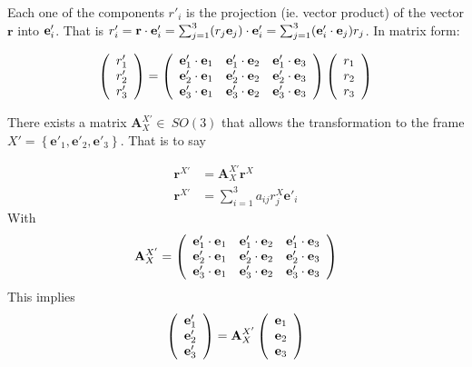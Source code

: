 Each one of the components $r'_i$ is the projection (ie. vector product) of the vector $\mathbf{r}$ into $\mathbf{e}'_i$. That is $r'_i = \mathbf{r} \cdot \mathbf{e}'_i =  \sum_{j=1}^{3} (r_j \mathbf{e}_j)\cdot \mathbf{e}'_i = \sum_{j=1}^{3} (\mathbf{e}'_i \cdot \mathbf{e}_j) r_j$. In matrix form:

\begin{equation}
\left( \begin{array}{c} r'_1 \\ r'_2 \\ r'_3 \end{array} \right) = 
\left( \begin{array}{c c c}  
\mathbf{e}'_1\cdot\mathbf{e}_1 & \mathbf{e}'_1\cdot\mathbf{e}_2 & \mathbf{e}'_1\cdot\mathbf{e}_3 \\
\mathbf{e}'_2\cdot\mathbf{e}_1 & \mathbf{e}'_2\cdot\mathbf{e}_2 & \mathbf{e}'_2\cdot\mathbf{e}_3 \\
\mathbf{e}'_3\cdot\mathbf{e}_1 & \mathbf{e}'_3\cdot\mathbf{e}_2 & \mathbf{e}'_3\cdot\mathbf{e}_3 \end{array} \right) 
\left( \begin{array}{c} r_1\\ r_2 \\ r_3 \end{array} \right)
\end{equation}

There exists a matrix $\mathbf{A}_X^{X'} \in\ SO(3)$ that allows the transformation to the frame {$X' = \left\{\mathbf{e}'_1, \mathbf{e}'_2, \mathbf{e}'_3 \right\}$}. That is to say

\begin{align}
\mathbf{r}^{X'} &= \mathbf{A}_X^{X'} \mathbf{r}^{X}\\
\mathbf{r}^{X'} &= \sum_{i=1}^{3} a_{ij} r_j^X \mathbf{e}'_i
\end{align}
With
\begin{equation} \label{eq:DCM}
\mathbf{A}_X^{X'} =
\left( \begin{array}{c c c}  
\mathbf{e}'_1\cdot\mathbf{e}_1 & \mathbf{e}'_1\cdot\mathbf{e}_2 & \mathbf{e}'_1\cdot\mathbf{e}_3 \\
\mathbf{e}'_2\cdot\mathbf{e}_1 & \mathbf{e}'_2\cdot\mathbf{e}_2 & \mathbf{e}'_2\cdot\mathbf{e}_3 \\
\mathbf{e}'_3\cdot\mathbf{e}_1 & \mathbf{e}'_3\cdot\mathbf{e}_2 & \mathbf{e}'_3\cdot\mathbf{e}_3 \end{array} \right) 
\end{equation}
This implies 
\begin{equation}
\left( \begin{array}{c} \mathbf{e}'_1 \\ \mathbf{e}'_2 \\ \mathbf{e}'_3 \end{array} \right) = \mathbf{A}_X^{X'} \left( \begin{array}{c} \mathbf{e}_1 \\ \mathbf{e}_2 \\ \mathbf{e}_3 \end{array} \right)
\end{equation}

